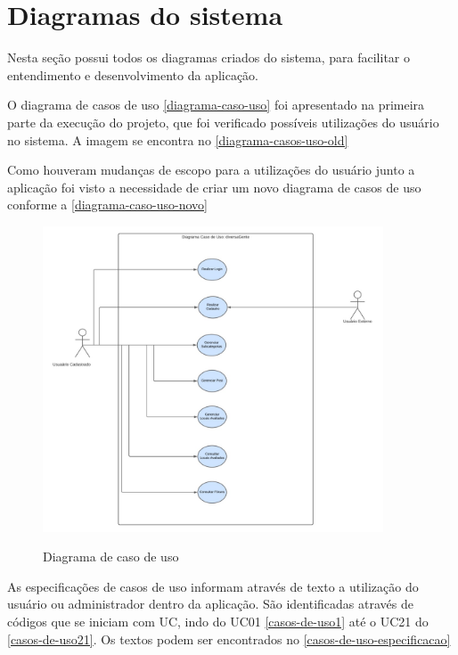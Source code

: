 
\section{Diagramas do sistema}

Nesta seção possui todos os diagramas criados do sistema, para facilitar o entendimento e desenvolvimento da aplicação. 

O diagrama de casos de uso  \autoref{diagrama-caso-uso} foi apresentado na primeira parte da execução do projeto, que foi verificado possíveis utilizações do usuário no sistema. A imagem se encontra no \autoref{diagrama-casos-uso-old}

Como houveram mudanças de escopo para a utilizações do usuário junto a aplicação foi visto a necessidade de criar um novo diagrama de casos de uso conforme a \autoref{diagrama-caso-uso-novo}



\pagebreak

\begin{figure}[htb]
	\centering
	\caption{\label{fig_arq_virado}Diagrama de caso de uso}
	\includegraphics[width=0.90\textwidth]{anexos/Casos de uso.jpeg}
	\label{diagrama-caso-uso-novo}
\end{figure}



As especificações de casos de uso informam através de texto a utilização do usuário ou administrador dentro da aplicação. São identificadas através de códigos que se iniciam com UC, indo do
UC01 \autoref{casos-de-uso1} até o UC21 do \autoref{casos-de-uso21}. Os textos podem ser encontrados no \autoref{casos-de-uso-especificacao}

